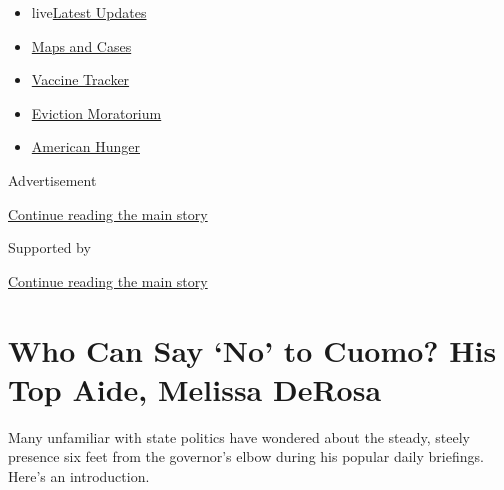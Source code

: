 \begin{itemize}
\tightlist
\item
  live\href{https://www.nytimes3xbfgragh.onion/2020/09/08/world/covid-19-coronavirus.html?name=styln-coronavirus-national\&region=TOP_BANNER\&block=storyline_menu_recirc\&action=click\&pgtype=Article\&impression_id=1ba095b0-f1f2-11ea-bdf2-59589793bb43\&variant=undefined}{Latest
  Updates}
\item
  \href{https://www.nytimes3xbfgragh.onion/interactive/2020/us/coronavirus-us-cases.html?name=styln-coronavirus-national\&region=TOP_BANNER\&block=storyline_menu_recirc\&action=click\&pgtype=Article\&impression_id=1ba095b1-f1f2-11ea-bdf2-59589793bb43\&variant=undefined}{Maps
  and Cases}
\item
  \href{https://www.nytimes3xbfgragh.onion/interactive/2020/science/coronavirus-vaccine-tracker.html?name=styln-coronavirus-national\&region=TOP_BANNER\&block=storyline_menu_recirc\&action=click\&pgtype=Article\&impression_id=1ba095b2-f1f2-11ea-bdf2-59589793bb43\&variant=undefined}{Vaccine
  Tracker}
\item
  \href{https://www.nytimes3xbfgragh.onion/2020/09/02/your-money/eviction-moratorium-covid.html?name=styln-coronavirus-national\&region=TOP_BANNER\&block=storyline_menu_recirc\&action=click\&pgtype=Article\&impression_id=1ba095b3-f1f2-11ea-bdf2-59589793bb43\&variant=undefined}{Eviction
  Moratorium}
\item
  \href{https://www.nytimes3xbfgragh.onion/interactive/2020/09/02/magazine/food-insecurity-hunger-us.html?name=styln-coronavirus-national\&region=TOP_BANNER\&block=storyline_menu_recirc\&action=click\&pgtype=Article\&impression_id=1ba0bcc0-f1f2-11ea-bdf2-59589793bb43\&variant=undefined}{American
  Hunger}
\end{itemize}

Advertisement

\protect\hyperlink{after-top}{Continue reading the main story}

Supported by

\protect\hyperlink{after-sponsor}{Continue reading the main story}

\hypertarget{who-can-say-no-to-cuomo-his-top-aide-melissa-derosa}{%
\section{Who Can Say `No' to Cuomo? His Top Aide, Melissa
DeRosa}\label{who-can-say-no-to-cuomo-his-top-aide-melissa-derosa}}

Many unfamiliar with state politics have wondered about the steady,
steely presence six feet from the governor's elbow during his popular
daily briefings. Here's an introduction.

